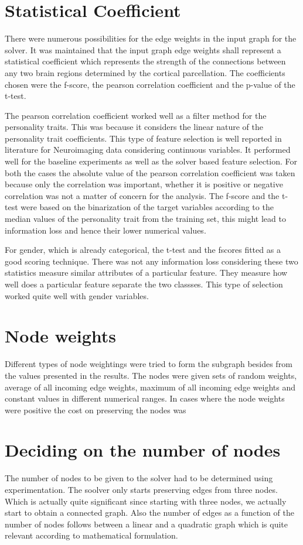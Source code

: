 \documentclass[msthesis.tex]{subfiles}
\begin{document}
\section{Statistical Coefficient}
There were numerous possibilities for the edge weights in the input graph for the solver. It was maintained that the input graph edge weights shall represent a statistical coefficient which represents the strength of the connections between any two brain regions determined by the cortical parcellation. The coefficients chosen were the f-score, the pearson correlation coefficient and the p-value of the t-test. 

The pearson correlation coefficient worked well as a filter method for the personality traits. This was because it considers the linear nature of the personality trait coefficients. This type of feature selection is well reported in literature for Neuroimaging data considering continuous variables. It performed well for the baseline experiments as well as the solver based feature selection. For both the cases the absolute value of the pearson correlation coefficient was taken because only the correlation was important, whether it is positive or negative correlation was not a matter of concern for the analysis. The f-score and the t-test were based on the binarization of the target variables according to the median values of the personality trait from the training set, this might lead to information loss and hence their lower numerical values. 

For gender, which is already categorical, the t-test and the fscores fitted as a good scoring technique. There was not any information loss considering these two statistics measure similar attributes of a particular feature. They measure how well does a particular feature separate the two classses. This type of selection worked quite well with gender variables.

\section{Node weights}
Different types of node weightings were tried to form the subgraph besides from the values presented in the results. The nodes were given sets of random weights, average of all incoming edge weights, maximum of all incoming edge weights and constant values in different numerical ranges. 
In cases where the node weights were positive the cost on preserving the nodes was 
\section{Deciding on the number of nodes}
The number of nodes to be given to the solver had to be determined using experimentation. The soolver only starts preserving edges from three nodes. Which is actually quite significant since starting with three nodes, we actually start to obtain a connected graph. Also the number of edges as a function of the number of nodes follows between a linear and a quadratic graph which is quite relevant according to mathematical formulation. 
\end{document}
